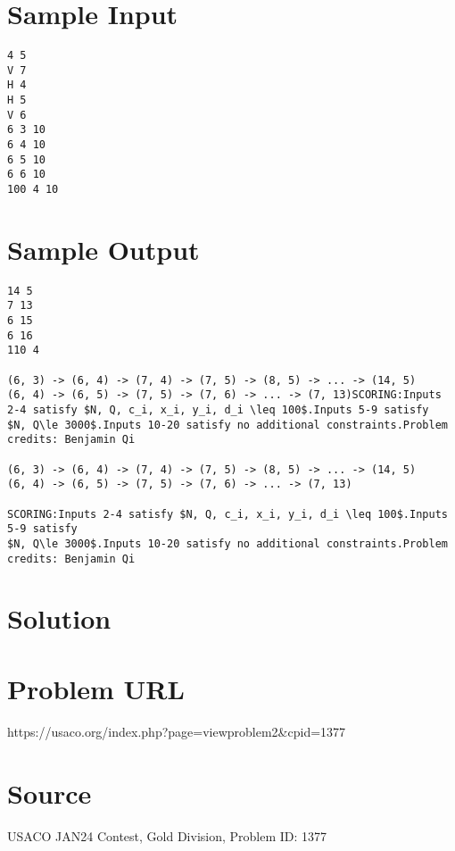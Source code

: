 \documentclass[12pt]{article}
\begin{document}
\section*{Sample Input}
\begin{verbatim}
4 5
V 7
H 4
H 5
V 6
6 3 10
6 4 10
6 5 10
6 6 10
100 4 10
\end{verbatim}

\section*{Sample Output}
\begin{verbatim}
14 5
7 13
6 15
6 16
110 4

(6, 3) -> (6, 4) -> (7, 4) -> (7, 5) -> (8, 5) -> ... -> (14, 5)
(6, 4) -> (6, 5) -> (7, 5) -> (7, 6) -> ... -> (7, 13)SCORING:Inputs 2-4 satisfy $N, Q, c_i, x_i, y_i, d_i \leq 100$.Inputs 5-9 satisfy
$N, Q\le 3000$.Inputs 10-20 satisfy no additional constraints.Problem credits: Benjamin Qi

(6, 3) -> (6, 4) -> (7, 4) -> (7, 5) -> (8, 5) -> ... -> (14, 5)
(6, 4) -> (6, 5) -> (7, 5) -> (7, 6) -> ... -> (7, 13)

SCORING:Inputs 2-4 satisfy $N, Q, c_i, x_i, y_i, d_i \leq 100$.Inputs 5-9 satisfy
$N, Q\le 3000$.Inputs 10-20 satisfy no additional constraints.Problem credits: Benjamin Qi
\end{verbatim}

\section*{Solution}


\section*{Problem URL}
https://usaco.org/index.php?page=viewproblem2&cpid=1377

\section*{Source}
USACO JAN24 Contest, Gold Division, Problem ID: 1377
\end{document}
